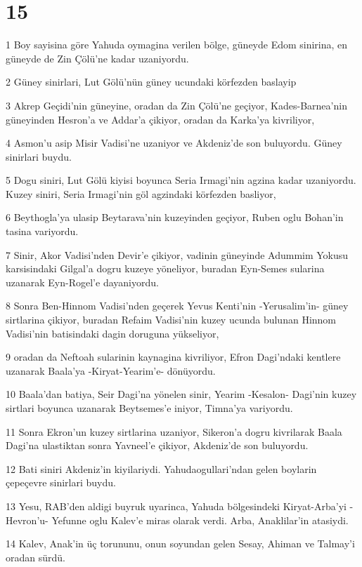 \chapter{15}

\par 1 Boy sayisina göre Yahuda oymagina verilen bölge, güneyde Edom sinirina, en güneyde de Zin Çölü'ne kadar uzaniyordu.
\par 2 Güney sinirlari, Lut Gölü'nün güney ucundaki körfezden baslayip
\par 3 Akrep Geçidi'nin güneyine, oradan da Zin Çölü'ne geçiyor, Kades-Barnea'nin güneyinden Hesron'a ve Addar'a çikiyor, oradan da Karka'ya kivriliyor,
\par 4 Asmon'u asip Misir Vadisi'ne uzaniyor ve Akdeniz'de son buluyordu. Güney sinirlari buydu.
\par 5 Dogu siniri, Lut Gölü kiyisi boyunca Seria Irmagi'nin agzina kadar uzaniyordu. Kuzey siniri, Seria Irmagi'nin göl agzindaki körfezden basliyor,
\par 6 Beythogla'ya ulasip Beytarava'nin kuzeyinden geçiyor, Ruben oglu Bohan'in tasina variyordu.
\par 7 Sinir, Akor Vadisi'nden Devir'e çikiyor, vadinin güneyinde Adummim Yokusu karsisindaki Gilgal'a dogru kuzeye yöneliyor, buradan Eyn-Semes sularina uzanarak Eyn-Rogel'e dayaniyordu.
\par 8 Sonra Ben-Hinnom Vadisi'nden geçerek Yevus Kenti'nin -Yerusalim'in- güney sirtlarina çikiyor, buradan Refaim Vadisi'nin kuzey ucunda bulunan Hinnom Vadisi'nin batisindaki dagin doruguna yükseliyor,
\par 9 oradan da Neftoah sularinin kaynagina kivriliyor, Efron Dagi'ndaki kentlere uzanarak Baala'ya -Kiryat-Yearim'e- dönüyordu.
\par 10 Baala'dan batiya, Seir Dagi'na yönelen sinir, Yearim -Kesalon- Dagi'nin kuzey sirtlari boyunca uzanarak Beytsemes'e iniyor, Timna'ya variyordu.
\par 11 Sonra Ekron'un kuzey sirtlarina uzaniyor, Sikeron'a dogru kivrilarak Baala Dagi'na ulastiktan sonra Yavneel'e çikiyor, Akdeniz'de son buluyordu.
\par 12 Bati siniri Akdeniz'in kiyilariydi. Yahudaogullari'ndan gelen boylarin çepeçevre sinirlari buydu.
\par 13 Yesu, RAB'den aldigi buyruk uyarinca, Yahuda bölgesindeki Kiryat-Arba'yi -Hevron'u- Yefunne oglu Kalev'e miras olarak verdi. Arba, Anaklilar'in atasiydi.
\par 14 Kalev, Anak'in üç torununu, onun soyundan gelen Sesay, Ahiman ve Talmay'i oradan sürdü.
